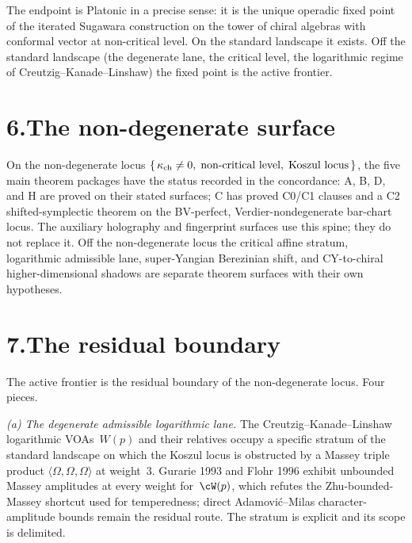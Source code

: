 The endpoint is Platonic in a precise sense: it is the unique
operadic fixed point of the iterated Sugawara construction on the
tower of chiral algebras with conformal vector at non-critical
level. On the standard landscape it exists. Off the standard
landscape (the degenerate lane, the critical level, the logarithmic
regime of Creutzig--Kanade--Linshaw) the fixed point is the active
frontier.

\section*{6.\quad The non-degenerate surface}

\noindent
On the non-degenerate locus
$\{\,\kappa_{\mathrm{ch}}\ne 0,\;\text{non-critical level},\;\text{Koszul locus}\,\}$,
the five main theorem packages have the status recorded in the
concordance: A, B, D, and H are proved on their stated surfaces; C has
proved C0/C1 clauses and a C2 shifted-symplectic theorem on the
BV-perfect, Verdier-nondegenerate bar-chart locus.
The auxiliary holography and fingerprint surfaces use this spine; they
do not replace it. Off the non-degenerate locus the critical affine
stratum, logarithmic admissible lane, super-Yangian Berezinian shift,
and CY-to-chiral higher-dimensional shadows are separate theorem
surfaces with their own hypotheses.

\section*{7.\quad The residual boundary}

\noindent
The active frontier is the residual boundary of the non-degenerate
locus. Four pieces.

\medskip

\noindent\emph{(a) The degenerate admissible logarithmic
lane.}\enspace
The Creutzig--Kanade--Linshaw logarithmic VOAs~$W(p)$ and their
relatives occupy a specific stratum of the standard landscape on
which the Koszul locus is obstructed by a Massey triple product
$\langle\Omega,\Omega,\Omega\rangle$ at weight~$3$. Gurarie 1993 and
Flohr 1996 exhibit unbounded Massey amplitudes at every weight
for~$\cW(p)$, which refutes the Zhu-bounded-Massey shortcut used
for temperedness; direct Adamovi\'c--Milas character-amplitude bounds
remain the residual route. The stratum is explicit and its scope is
delimited.

\medskip

